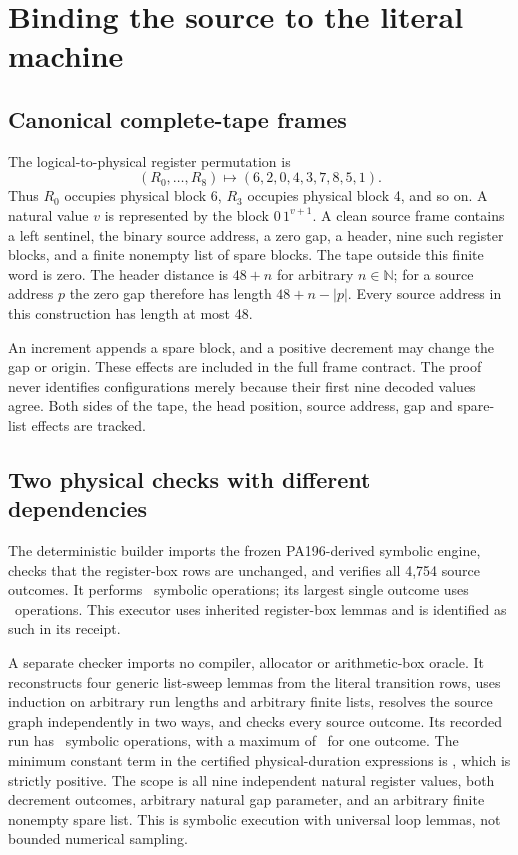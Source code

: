 \documentclass[11pt,letterpaper]{article}
\begin{document}
\section{Binding the source to the literal machine}
\label{sec:physical}
\subsection{Canonical complete-tape frames}
The logical-to-physical register permutation is
\[
 (R_0,\ldots,R_8)\longmapsto(6,2,0,4,3,7,8,5,1).
\]
Thus $R_0$ occupies physical block 6, $R_3$ occupies physical block 4,
and so on. A natural value $v$ is represented by the block
$0\,1^{v+1}$. A clean source frame contains a left sentinel, the binary
source address, a zero gap, a header, nine such register blocks, and a
finite nonempty list of spare blocks. The tape outside this finite word
is zero. The header distance is $48+n$ for arbitrary $n\in\mathbb N$;
for a source address $p$ the zero gap therefore has length $48+n-|p|$.
Every source address in this construction has length at most 48.

An increment appends a spare block, and a positive decrement may change
the gap or origin. These effects are included in the full frame contract.
The proof never identifies configurations merely because their first
nine decoded values agree. Both sides of the tape, the head position,
source address, gap and spare-list effects are tracked.

\subsection{Two physical checks with different dependencies}
The deterministic builder imports the frozen PA196-derived symbolic
engine, checks that the register-box rows are unchanged, and verifies all
4,754 source outcomes. It performs \BuilderSteps\ symbolic operations;
its largest single outcome uses \BuilderMax\ operations. This executor
uses inherited register-box lemmas and is identified as such in its
receipt.

A separate checker imports no compiler, allocator or arithmetic-box
oracle. It reconstructs four generic list-sweep lemmas from the literal
transition rows, uses induction on arbitrary run lengths and arbitrary
finite lists, resolves the source graph independently in two ways, and
checks every source outcome. Its recorded run has \LiteralSteps\ symbolic
operations, with a maximum of \LiteralMax\ for one outcome. The minimum
constant term in the certified physical-duration expressions is
\MinDuration, which is strictly positive. The scope is all nine
independent natural register values, both decrement outcomes, arbitrary
natural gap parameter, and an arbitrary finite nonempty spare list.
This is symbolic execution with universal loop lemmas, not bounded
numerical sampling.
\end{document}
